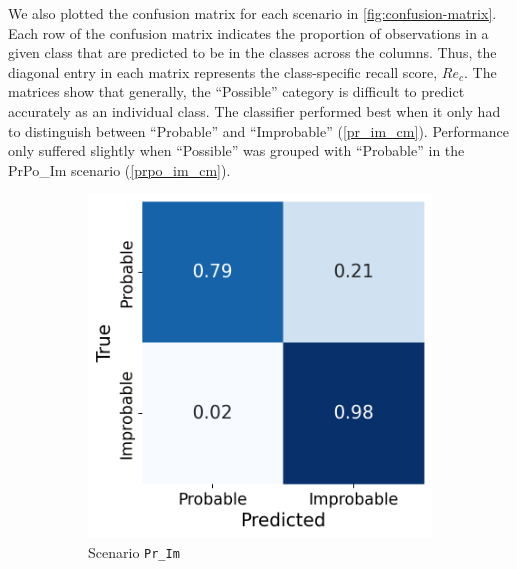 \documentclass[Journal,letterpaper, SingleSpace, InsideFigs]{ascelike-new}
\begin{document}
We also plotted the confusion matrix for each scenario in \autoref{fig:confusion-matrix}.
Each row of the confusion matrix indicates the proportion of observations in a given class that are predicted to be in the classes across the columns.
Thus, the diagonal entry in each matrix represents the class-specific recall score, $Re_{c}$.
The matrices show that generally, the ``Possible'' category is difficult to predict accurately as an individual class.
The classifier performed best when it only had to distinguish between ``Probable'' and ``Improbable'' (\autoref{pr_im_cm}). Performance only suffered slightly when ``Possible'' was grouped with ``Probable'' in the PrPo\_Im scenario (\autoref{prpo_im_cm}).

\begin{figure}[ht]
  \centering
  \begin{subfigure}[t]{.25\linewidth}
    \centering
    \includegraphics[width=\linewidth]{opt-confusion-matrix-Pr_Im-128-px.png}
    \caption{Scenario \texttt{Pr\_Im}}
    \label{pr_im_cm}
  \end{subfigure}%
   \begin{subfigure}[t]{.25\linewidth}
    \centering

\end{subfigure}
\end{figure}
\end{document}
